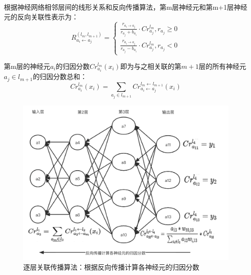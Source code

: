 根据神经网络相邻层间的线形关系和反向传播算法，第m层神经元和第m+1层神经元的反向关联性表示为：
$$
R_{a_{i} \leftarrow a_{j}}^{(l_{m}, l_{m+1})}=\left\{\begin{array}{l}\frac{r_{a_{i}  \rightarrow a_{j} }}{r_{a_{j}}+b_{a_{i}}} \cdot C r_{a_{j}}^{l_{m} }, r_{a_{j}} \geq 0 \\ \frac{r_{a_{i} \rightarrow a_{j} }}{r_{a_{j} }-b_{a_{i}}} \cdot C r_{a_{j}}^{l_{m} }, r_{a_{j}}<0\end{array}\right.
$$


第m层的神经元$a_{i}$的归因分数$Cr_{a_{i}}^{l_{m}}\left(x_{i}\right)$即为与之相关联的第$m+1$层的所有神经元${a_{j}\in l_{m+1}}$的归因分数总和：
$$
Cr_{a_{i}}^{l_{m}}\left(x_{i}\right)=\sum_{a_{j} \in l_{m+1}} Cr_{a_{i} \leftarrow a_{j}}^{l_{m} \leftarrow l_{m+1}}\left(x_{i}\right)
$$

\begin{figure}[!hbt]
\centering
	\includegraphics[scale=0.3]{fig2/C3/自适应-反向传播}%
	\caption{逐层关联传播算法：根据反向传播计算各神经元的归因分数}
	\label{fig:逐层关联传播算法：根据反向传播计算各神经元的归因分数}	
\end{figure}


